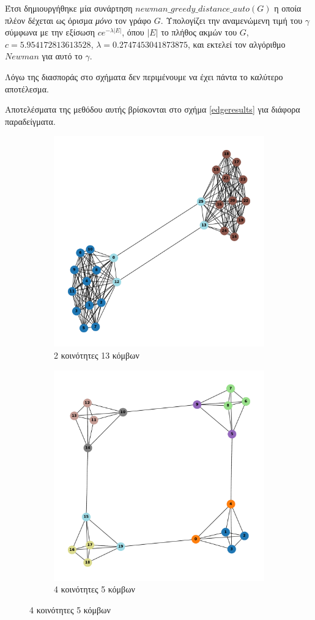 \documentclass[12pt, letterpaper]{article}
\begin{document}
Έτσι δημιουργήθηκε μία συνάρτηση $newman\_greedy\_distance\_auto(G)$ η οποία πλέον
δέχεται ως όρισμα \emph{μόνο} τον γράφο $G$. Υπολογίζει την αναμενώμενη τιμή του $\gamma$
σύμφωνα με την εξίσωση $ce^{-\lambda |E|}$, όπου $|E|$ το πλήθος ακμών του $G$, 
$c=5.954172813613528$, $\lambda = 0.2747453041873875$, και εκτελεί τον αλγόριθμο $Newman$ για αυτό το $\gamma$. 

Λόγω της διασποράς στο σχήματα δεν περιμένουμε να έχει πάντα το καλύτερο
αποτέλεσμα.

Αποτελέσματα της μεθόδου αυτής βρίσκονται στο σχήμα \ref{edgeresults} για διάφορα παραδείγματα. 










\begin{figure}
  \begin{subfigure}{0.5\textwidth}
    \centering
    \includegraphics[width=0.6\linewidth]{AUTO2,13.pdf}
    \caption{2 κοινότητες 13 κόμβων}
    \label{}
  \end{subfigure}
  \begin{subfigure}{0.5\textwidth}
    \centering
    \includegraphics[width=0.6\linewidth]{AUTO4,5.pdf}
    \caption{4 κοινότητες 5 κόμβων}
    \label{}
  \end{subfigure}


\end{figure}
\end{document}
